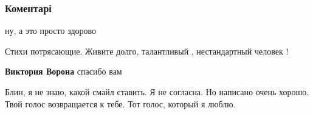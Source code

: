 
 
 
 
 
\subsubsection{Коментарі}
\label{sec:02_08_2021.fb.bilchenko_evgenia.1.mirozdanie.cmt}

\begin{itemize}
 
ну, а это просто здорово

 
Стихи потрясающие. Живите долго, талантливый , нестандартный человек !
\begin{itemize}
 
\textbf{Виктория Ворона} спасибо вам
\end{itemize}

 

Блин, я не знаю, какой смайл ставить. Я не согласна. Но написано очень хорошо.
Твой голос возвращается к тебе. Тот голос, который я люблю.

\begin{itemize}
 

\end{itemize}
\end{itemize}

